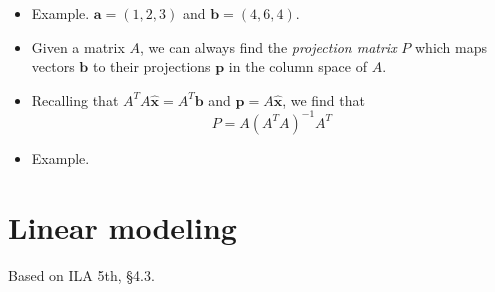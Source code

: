 \documentclass[11pt,oneside]{amsbook}
\theoremstyle{definition}
\theoremstyle{plain}
\theoremstyle{definition}
\theoremstyle{remark}
\numberwithin{equation}{section}
\numberwithin{figure}{section}
\begin{document}
\begin{itemize}
\begin{itemize}
  \item Given a vector $\mathbf{a}$ and a vector $\mathbf{b}$, what multiple $\hat x$ makes $\mathbf{a}\hat x$ closest to $\mathbf{b}$?
  \item Once again, we find an optimal solution when $\mathbf{b}-\mathbf{a}\hat x$ is orthogonal to $\mathbf{a}$. In equations this means
    \[\mathbf{a}^T(\mathbf{b}-\mathbf{a}\hat x)=0
    \]
  \item We can actually solve this explicitly to obtain
    \[\hat x=\mathbf{a}^T\mathbf{b}/\mathbf{a}^T\mathbf{a}
    \]
  \item Once again the projection is simply
    \[\mathbf{p}=
      \frac{\mathbf{a}^T\mathbf{b}}{\mathbf{a}^T\mathbf{a}}
      \mathbf{a}
    \]
  \end{itemize}
\item Example. $\mathbf{a}=(1,2,3)$ and $\mathbf{b}=(4,6,4)$.
\item Given a matrix $A$, we can always find the \emph{projection matrix} $P$ which maps vectors $\mathbf{b}$ to their projections $\mathbf{p}$ in the column space of $A$.
\item Recalling that $A^TA\hat{\mathbf{x}}=A^T\mathbf{b}$ and $\mathbf{p}=A\hat{\mathbf{x}}$, we find that
  \[P=A(A^TA)^{-1}A^T
  \]
\item Example.
\end{itemize}

\newpage
\section{Linear modeling}

Based on ILA 5th, \S 4.3.
\end{document}
